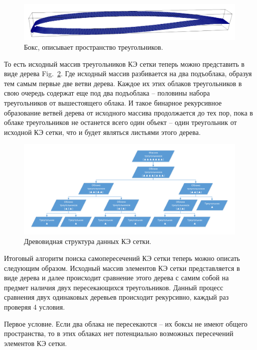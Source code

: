 \documentclass[
11pt,%
tightenlines,%
twoside,%
onecolumn,%
nofloats,%
nobibnotes,%
nofootinbib,%
superscriptaddress,%
noshowpacs,%
centertags]%
{revtex4}
\begin{document}
\begin{figure}[h]
\includegraphics[width=1.0\textwidth]{pics/pic_3.png}
\caption{Бокс, описывает пространство треугольников.}\label{fig:3}
\end{figure}

То есть исходный массив треугольников КЭ сетки теперь можно представить в виде дерева Fig.~\ref{fig:4}. Где исходный массив разбивается на два подъоблака, образуя тем самым первые две ветви дерева. Каждое их этих облаков треугольников в свою очередь содержат еще под два подъоблака – половины набора треугольников от вышестоящего облака. И такое бинарное рекурсивное образование ветвей дерева от исходного массива продолжается до тех пор, пока в облаке треугольников не останется всего один объект – один треугольник от исходной КЭ сетки, что и будет являться листьями этого дерева. 

\begin{figure}[h]
\includegraphics[width=1.0\textwidth]{pics/pic_4.pdf}
\caption{Древовидная структура данных КЭ сетки.}\label{fig:4}
\end{figure}

Итоговый алгоритм поиска самопересечений КЭ сетки теперь можно описать следующим образом. Исходный массив элементов КЭ сетки представляется в виде дерева и далее происходит сравнение этого дерева с самим собой на предмет наличия двух пересекающихся треугольников. Данный процесс сравнения двух одинаковых деревьев происходит рекурсивно, каждый раз проверяя 4 условия.

Первое условие. Если два облака не пересекаются – их боксы не имеют общего пространства, то в этих облаках нет потенциально возможных пересечений элементов КЭ сетки.
\end{document}
